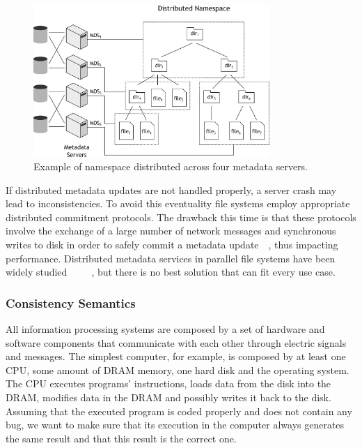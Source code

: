 \begin{figure}[!htb]
\centering
\includegraphics[width=0.8\textwidth]{figures/namespace}
\caption{Example of namespace distributed across four metadata servers.}
\label{figure: namespace}
\end{figure}

If distributed metadata updates are not handled properly, a server crash may lead to inconsistencies. To avoid this eventuality file systems employ appropriate distributed commitment protocols. The drawback this time 
is that these protocols involve the exchange of a large number of network messages and synchronous writes to disk in order to safely commit a metadata update~\cite{Stamos1990}~\cite{Gray2006}, thus impacting performance. 
Distributed metadata services in parallel file systems have been widely studied~\cite{Zhang2001}~\cite{Fan2004}~\cite{Michalak2005}~\cite{Sinnamohideen2010}~\cite{Congiu2012}, but there is no best solution that can fit 
every use case.

\subsubsection{Consistency Semantics}
All information processing systems are composed by a set of hardware and software components that communicate with each other through electric signals and messages. The simplest computer, for example, is composed by at 
least one CPU, some amount of DRAM memory, one hard disk and the operating system. The CPU executes programs' instructions, loads data from the disk into the DRAM, modifies data in the DRAM and possibly writes it 
back to the disk. Assuming that the executed program is coded properly and does not contain any bug, we want to make sure that its execution in the computer always generates the same result and that this result is the 
correct one.

